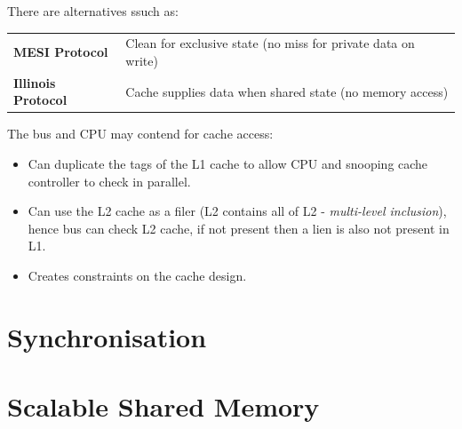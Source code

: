 There are alternatives ssuch as:
\begin{center}
    \begin{tabular}{l p{}}
        \textbf{MESI Protocol} & Clean for exclusive state (no miss for private data on write) \\
        \textbf{Illinois Protocol} & Cache supplies data when shared state (no memory access) \\
    \end{tabular}
\end{center}
The bus and CPU may contend for cache access:
\begin{itemize}
    \item Can duplicate the tags of the L1 cache to allow CPU and snooping cache controller to check in parallel.
    \item Can use the L2 cache as a filer (L2 contains all of L2 - \textit{multi-level inclusion}), hence bus can check L2 cache, if not present then a lien is also not present in L1.
    \item Creates constraints on the cache design.
\end{itemize}

\section{Synchronisation}
\unfinished

\section{Scalable Shared Memory}
\unfinished